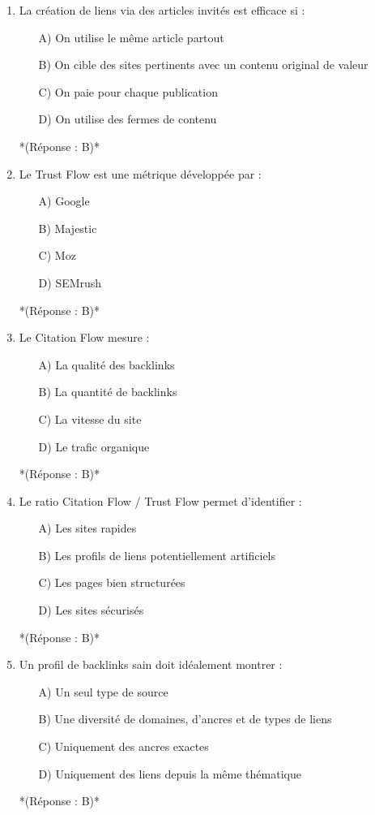 \documentclass[12pt,a4paper,twoside]{report}
\begin{document}
\begin{enumerate}
\item La création de liens via des articles invités est efficace si :
\begin{itemize}
\item[A)] On utilise le même article partout
\item[B)] On cible des sites pertinents avec un contenu original de valeur
\item[C)] On paie pour chaque publication
\item[D)] On utilise des fermes de contenu
\end{itemize}
*(Réponse : B)*

\item Le Trust Flow est une métrique développée par :
\begin{itemize}
\item[A)] Google
\item[B)] Majestic
\item[C)] Moz
\item[D)] SEMrush
\end{itemize}
*(Réponse : B)*

\item Le Citation Flow mesure :
\begin{itemize}
\item[A)] La qualité des backlinks
\item[B)] La quantité de backlinks
\item[C)] La vitesse du site
\item[D)] Le trafic organique
\end{itemize}
*(Réponse : B)*

\item Le ratio Citation Flow / Trust Flow permet d'identifier :
\begin{itemize}
\item[A)] Les sites rapides
\item[B)] Les profils de liens potentiellement artificiels
\item[C)] Les pages bien structurées
\item[D)] Les sites sécurisés
\end{itemize}
*(Réponse : B)*

\item Un profil de backlinks sain doit idéalement montrer :
\begin{itemize}
\item[A)] Un seul type de source
\item[B)] Une diversité de domaines, d'ancres et de types de liens
\item[C)] Uniquement des ancres exactes
\item[D)] Uniquement des liens depuis la même thématique
\end{itemize}
*(Réponse : B)*

\end{enumerate}
\end{document}
